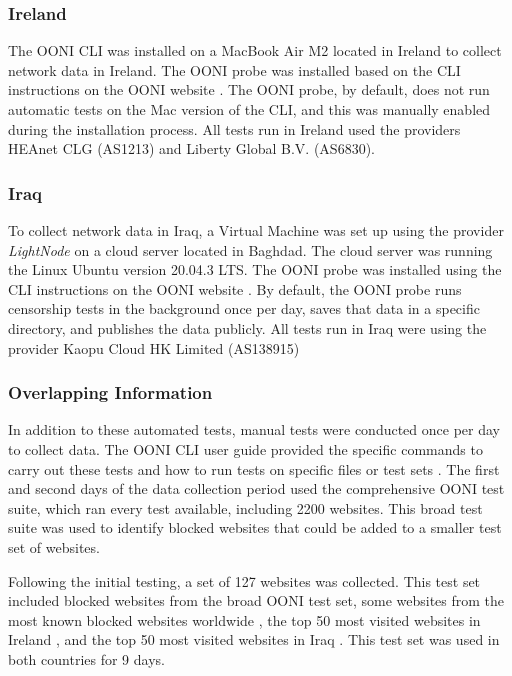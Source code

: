 \subsubsection{Ireland}

The OONI CLI was installed on a MacBook Air M2 located in Ireland to collect network data in Ireland. The OONI probe was installed based on the CLI instructions on the OONI website \cite{OONISCLI}. The OONI probe, by default, does not run automatic tests on the Mac version of the CLI, and this was manually enabled during the installation process. All tests run in Ireland used the providers HEAnet CLG (AS1213) and Liberty Global B.V. (AS6830).

\subsubsection{Iraq}

To collect network data in Iraq, a Virtual Machine was set up using the provider \textit{LightNode} \cite{lightnodeLightNodeGlobal} on a cloud server located in Baghdad. The cloud server was running the Linux Ubuntu version 20.04.3 LTS. The OONI probe was installed using the CLI instructions on the OONI website \cite{OONISCLI}. By default, the OONI probe runs censorship tests in the background once per day, saves that data in a specific directory, and publishes the data publicly. All tests run in Iraq were using the provider Kaopu Cloud HK Limited (AS138915)

\subsubsection{Overlapping Information}

In addition to these automated tests, manual tests were conducted once per day to collect data. The OONI CLI user guide provided the specific commands to carry out these tests and how to run tests on specific files or test sets \cite{ooniUserGuideCLI}. The first and second days of the data collection period used the comprehensive OONI test suite, which ran every test available, including 2200 websites. This broad test suite was used to identify blocked websites that could be added to a smaller test set of websites.

Following the initial testing, a set of 127 websites was collected. This test set included blocked websites from the broad OONI test set, some websites from the most known blocked websites worldwide \cite{blocksiteMostBlocked}, the top 50 most visited websites in Ireland \cite{top50irishwebsites}, and the top 50 most visited websites in Iraq \cite{top50IraqWebsites}. This test set was used in both countries for 9 days.

